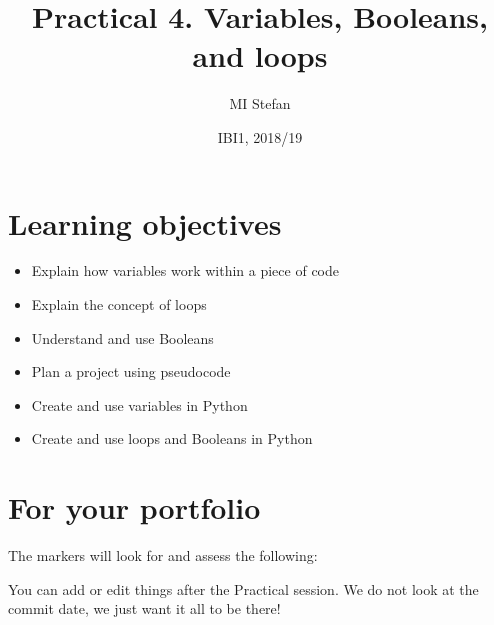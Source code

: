 \documentclass[pdflatex,a4paper]{article}
\title{Practical 4. Variables, Booleans, and loops}
\author{MI Stefan}
\date{IBI1, 2018/19}
\begin{document}
\newcommand{\<}{\textless}
\renewcommand{\>}{\textgreater}


\maketitle

\section{Learning objectives}

\begin{itemize}
\item
Explain how variables work within a piece of code
\item
Explain the concept of loops
\item
Understand and use Booleans
\item
Plan a project using pseudocode
\item
Create and use variables in Python 
\item
Create and use loops and Booleans in Python
\end{itemize}

\section{For your portfolio}

The markers will look for and assess the following:




You can add or edit things after the Practical session. We do not look at the commit date, we just want it all to be there!
\end{document}
